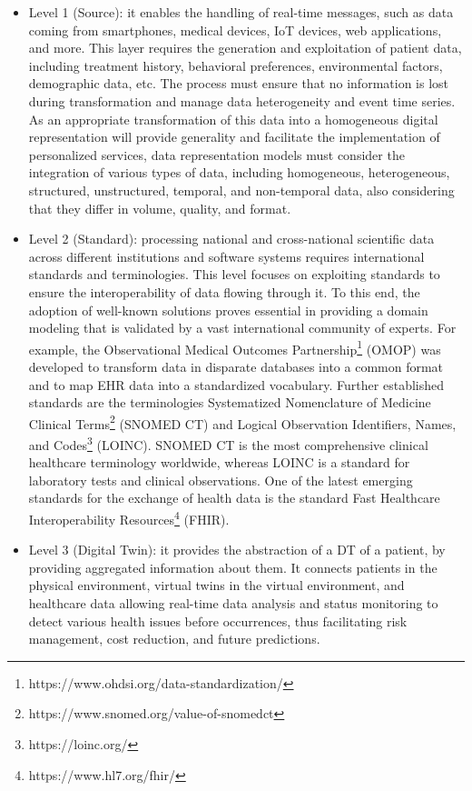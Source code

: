 \begin{itemize}
    \item Level 1 (Source): it enables the handling of real-time messages, such as data coming from smartphones, medical devices, IoT devices, web applications, and more. This layer requires the generation and exploitation of patient data, including treatment history, behavioral preferences, environmental factors, demographic data, etc. The process must ensure that no information is lost during transformation and manage data heterogeneity and event time series. As an appropriate transformation of this data into a homogeneous digital representation will provide generality and facilitate the implementation of personalized services, data representation models must consider the integration of various types of data, including homogeneous, heterogeneous, structured, unstructured, temporal, and non-temporal data, also considering that they differ in volume, quality, and format. 
    \item Level 2 (Standard): processing national and cross-national scientific data across different institutions and software systems requires international standards and terminologies. This level focuses on exploiting standards to ensure the interoperability of data flowing through it. To this end, the adoption of well-known solutions proves essential in providing a domain modeling that is validated by a vast international community of experts. For example, the Observational Medical Outcomes Partnership\footnote{https://www.ohdsi.org/data-standardization/} (OMOP) was developed to transform data in disparate databases into a common format and to map EHR data into a standardized vocabulary. Further established standards are the terminologies Systematized Nomenclature of Medicine Clinical Terms\footnote{https://www.snomed.org/value-of-snomedct} (SNOMED CT) and Logical Observation Identifiers, Names, and Codes\footnote{https://loinc.org/} (LOINC). SNOMED CT is the most comprehensive clinical healthcare terminology worldwide, whereas LOINC is a standard for laboratory tests and clinical observations. One of the latest emerging standards for the exchange of health data is the standard Fast Healthcare Interoperability Resources\footnote{https://www.hl7.org/fhir/} (FHIR).
    \item Level 3 (Digital Twin): it provides the abstraction of a DT of a patient, by providing aggregated information about them. It connects patients in the physical environment, virtual twins in the virtual environment, and healthcare data allowing real-time data analysis and status monitoring to detect various health issues before occurrences, thus facilitating risk management, cost reduction, and future predictions. 

\end{itemize}
